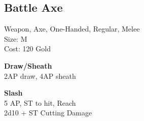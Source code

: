 \subsection{Battle Axe}\label{weapon:battleaxe}
Weapon, Axe, One-Handed, Regular, Melee\\
Size: M\\
Cost: 120 Gold

\textbf{Draw/Sheath}\\
2AP draw, 4AP sheath

\textbf{Slash}\\
5 AP, ST to hit,  Reach\\
2d10 + \texttimes ST Cutting Damage
